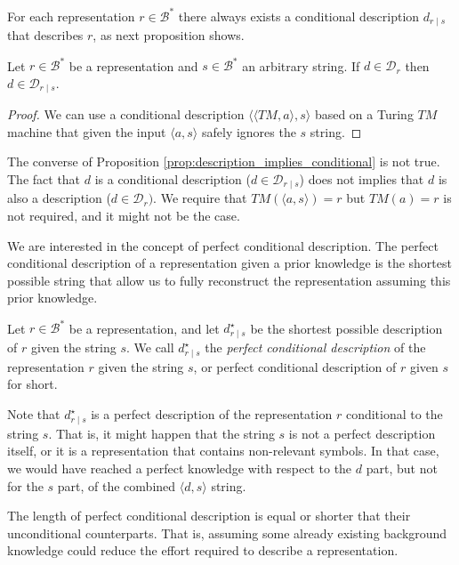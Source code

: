For each representation $r \in \mathcal{B}^\ast$ there always exists a conditional description $d_{r \mid s}$ that describes $r$, as next proposition shows.

\begin{proposition}
\label{prop:description_implies_conditional}
Let $r \in \mathcal{B}^\ast$ be a representation and $s \in \mathcal{B}^\ast$ an arbitrary string. If $d \in \mathcal{D}_{r}$ then $d \in \mathcal{D}_{r \mid s}$.
\end{proposition}
\begin{proof}
We can use a conditional description $\langle \langle TM, a \rangle, s \rangle$ based on a Turing $TM$ machine that given the input $\langle a, s \rangle$ safely ignores the $s$ string.
\end{proof}

The converse of Proposition \ref{prop:description_implies_conditional} is not true. The fact that $d$ is a conditional description ($d \in \mathcal{D}_{r \mid s}$) does not implies that $d$ is also a description ($d \in \mathcal{D}_{r})$. We require that $TM \left(\langle a, s \rangle \right) = r$ but $TM \left( a \right) = r$ is not required, and it might not be the case.

We are interested in the concept of perfect conditional description. The perfect conditional description of a representation given a prior knowledge is the shortest possible string that allow us to fully reconstruct the representation assuming this prior knowledge.

\begin{definition}
Let $r \in \mathcal{B}^\ast$ be a representation, and let $d^\star_{r \mid s}$ be the shortest possible description of $r$ given the string $s$. We call $d^\star_{r \mid s}$ the \emph{perfect conditional description} of the representation $r$ given the string $s$, or perfect conditional description of $r$ given $s$ for short.
\end{definition}

Note that $d^\star_{r \mid s}$ is a perfect description of the representation $r$ conditional to the string $s$. That is, it might happen that the string $s$ is not a perfect description itself, or it is a representation that contains non-relevant symbols. In that case, we would have reached a perfect knowledge with respect to the $d$ part, but not for the $s$ part, of the combined $\langle d, s \rangle$ string.

The length of perfect conditional description is equal or shorter that their unconditional counterparts. That is, assuming some already existing background knowledge could reduce the effort required to describe a representation.

